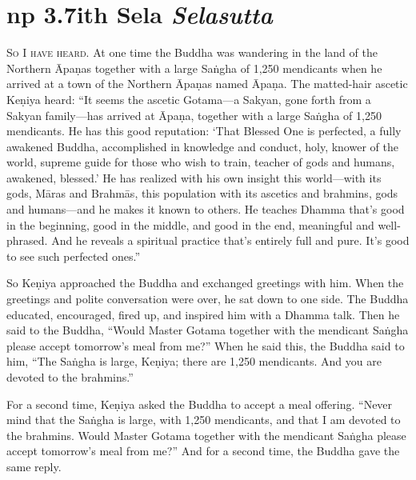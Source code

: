 \documentclass[12pt,openany]{book}%
\newcommand*{\suttatitleacronym}[1]{\smaller[2]{#1}\vspace*{.3em}}
\newcommand*{\suttatitletranslation}[1]{\linebreak{#1}}
\newcommand*{\suttatitleroot}[1]{\linebreak\smaller[2]\itshape{#1}}
\newcommand*{\tocacronym}[1]{\hspace*{-3.3em}{#1}\quad}
\newcommand*{\toctranslation}[1]{#1}
\newcommand*{\tocroot}[1]{(\textit{#1})}
\newcommand*{\scevam}[1]{\textsc{#1}}
\begin{document}
%
\section*{{\suttatitleacronym Snp 3.7}{\suttatitletranslation With Sela }{\suttatitleroot Selasutta}}
\addcontentsline{toc}{section}{\tocacronym{Snp 3.7} \toctranslation{With Sela } \tocroot{Selasutta}}

\scevam{So I have heard. }At one time the Buddha was wandering in the land of the Northern \textsanskrit{Āpaṇas} together with a large \textsanskrit{Saṅgha} of 1,250 mendicants when he arrived at a town of the Northern \textsanskrit{Āpaṇas} named \textsanskrit{Āpaṇa}. The matted-hair ascetic \textsanskrit{Keṇiya} heard: “It seems the ascetic Gotama—a Sakyan, gone forth from a Sakyan family—has arrived at \textsanskrit{Āpaṇa}, together with a large \textsanskrit{Saṅgha} of 1,250 mendicants. He has this good reputation: ‘That Blessed One is perfected, a fully awakened Buddha, accomplished in knowledge and conduct, holy, knower of the world, supreme guide for those who wish to train, teacher of gods and humans, awakened, blessed.’ He has realized with his own insight this world—with its gods, \textsanskrit{Māras} and \textsanskrit{Brahmās}, this population with its ascetics and brahmins, gods and humans—and he makes it known to others. He teaches Dhamma that’s good in the beginning, good in the middle, and good in the end, meaningful and well-phrased. And he reveals a spiritual practice that’s entirely full and pure. It’s good to see such perfected ones.” 

So \textsanskrit{Keṇiya} approached the Buddha and exchanged greetings with him. When the greetings and polite conversation were over, he sat down to one side. The Buddha educated, encouraged, fired up, and inspired him with a Dhamma talk. Then he said to the Buddha, “Would Master Gotama together with the mendicant \textsanskrit{Saṅgha} please accept tomorrow’s meal from me?” When he said this, the Buddha said to him, “The \textsanskrit{Saṅgha} is large, \textsanskrit{Keṇiya}; there are 1,250 mendicants. And you are devoted to the brahmins.” 

For a second time, \textsanskrit{Keṇiya} asked the Buddha to accept a meal offering. “Never mind that the \textsanskrit{Saṅgha} is large, with 1,250 mendicants, and that I am devoted to the brahmins. Would Master Gotama together with the mendicant \textsanskrit{Saṅgha} please accept tomorrow’s meal from me?” And for a second time, the Buddha gave the same reply. 
\end{document}
